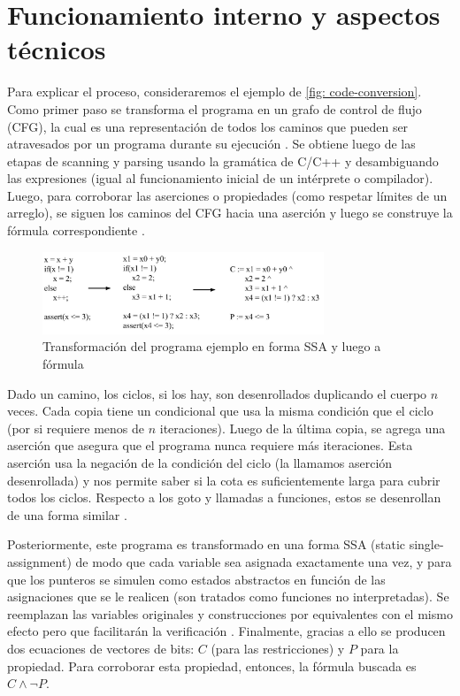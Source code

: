 \documentclass[runningheads]{llncs}
\begin{document}
\section{Funcionamiento interno y aspectos técnicos}
Para explicar el proceso, consideraremos el ejemplo de \autoref{fig: code-conversion}.
Como primer paso se transforma el programa en un grafo de control de flujo (CFG), la cual es una representación de todos los caminos que pueden ser atravesados por un programa durante su ejecución \cite{cbmc-slides}.
Se obtiene luego de las etapas de scanning y parsing usando la gramática de C/C++ y desambiguando las expresiones (igual al funcionamiento inicial de un intérprete o compilador).
Luego, para corroborar las aserciones o propiedades (como respetar límites de un arreglo), se siguen los caminos del CFG hacia una aserción y luego se construye la fórmula correspondiente \cite{cbmc-slides}.

\begin{figure}[!htb]
  \centering
  \includegraphics[width=0.75\textwidth]{code-conversion.jpg}
  \caption{Transformación del programa ejemplo en forma SSA y luego a fórmula}
  \label{fig: code-conversion}
\end{figure}

Dado un camino, los ciclos, si los hay, son desenrollados duplicando el cuerpo $n$ veces.
Cada copia tiene un condicional que usa la misma condición que el ciclo (por si requiere menos de $n$ iteraciones).
Luego de la última copia, se agrega una aserción que asegura que el programa nunca requiere más iteraciones.
Esta aserción usa la negación de la condición del ciclo (la llamamos aserción desenrollada) y nos permite saber si la cota es suficientemente larga para cubrir todos los ciclos.
Respecto a los goto y llamadas a funciones, estos se desenrollan de una forma similar \cite{tacas-2004}.

Posteriormente, este programa es transformado en una forma SSA (static single-assignment) de modo que cada variable sea asignada exactamente una vez, y para que los punteros se simulen como estados abstractos en función de las asignaciones que se le realicen (son tratados como funciones no interpretadas).
Se reemplazan las variables originales y construcciones por equivalentes con el mismo efecto pero que facilitarán la verificación \cite{cbmc-slides}.
Finalmente, gracias a ello se producen dos ecuaciones de vectores de bits: $C$ (para las restricciones) y $P$ para la propiedad.
Para corroborar esta propiedad, entonces, la fórmula buscada es $C \land \neg P$.
\end{document}
